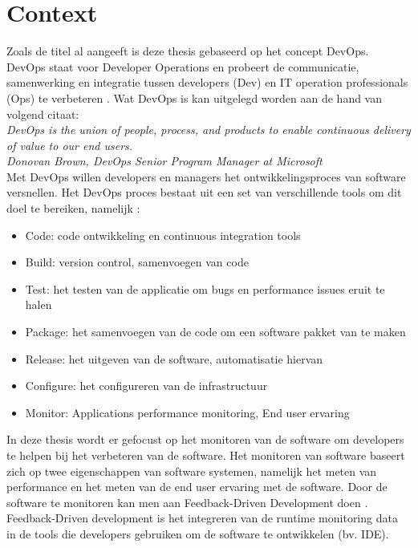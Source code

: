 \chapter{Context}
Zoals de titel al aangeeft is deze thesis gebaseerd op het concept DevOps. DevOps staat voor Developer Operations en probeert de communicatie, samenwerking en integratie tussen developers (Dev) en IT operation professionals (Ops) te verbeteren \cite{waller2015including}. Wat DevOps is kan uitgelegd worden aan de hand van volgend citaat: \\

\textit{DevOps is the union of people, process, and products to enable continuous delivery of value to our end users.\\
Donovan Brown, DevOps Senior Program Manager at Microsoft} \cite{de2016devops}\\

Met DevOps willen developers en managers het ontwikkelingsproces van software versnellen. Het DevOps proces bestaat uit een set van verschillende tools om dit doel te bereiken, namelijk \cite{DevOpsWiki}:
\begin{itemize}
\item Code: code ontwikkeling en continuous integration tools
\item Build: version control, samenvoegen van code
\item Test: het testen van de applicatie om bugs en performance issues eruit te halen
\item Package: het samenvoegen van de code om een software pakket van te maken
\item Release: het uitgeven van de software, automatisatie hiervan
\item Configure: het configureren van de infrastructuur
\item Monitor: Applications performance monitoring, End user ervaring
\end{itemize}

In deze thesis wordt er gefocust op het monitoren van de software om developers te helpen bij het verbeteren van de software. Het monitoren van software baseert zich op twee eigenschappen van software systemen, namelijk het meten van performance en het meten van de end user ervaring met de software. Door de software te monitoren kan men aan Feedback-Driven Development doen \cite{cito2015runtime}. Feedback-Driven development is het integreren van de runtime monitoring data in de tools die developers gebruiken om de software te ontwikkelen (bv. IDE). \\


